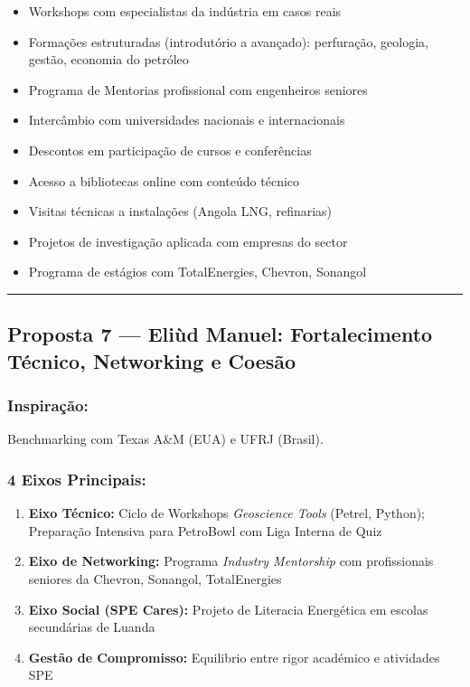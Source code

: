 \documentclass[12pt,a4paper]{article}
\begin{document}
\begin{itemize}[itemsep=0.15cm]
    \item Workshops com especialistas da indústria em casos reais
    \item Formações estruturadas (introdutório a avançado): perfuração, geologia, gestão, economia do petróleo
    \item Programa de Mentorias profissional com engenheiros seniores
    \item Intercâmbio com universidades nacionais e internacionais
    \item Descontos em participação de cursos e conferências
    \item Acesso a bibliotecas online com conteúdo técnico
    \item Visitas técnicas a instalações (Angola LNG, refinarias)
    \item Projetos de investigação aplicada com empresas do sector
    \item Programa de estágios com TotalEnergies, Chevron, Sonangol
\end{itemize}

\textcolor{spe-secondary}{\hspace{0.5cm}\rule{0.4\linewidth}{0.8pt}}

\subsection{Proposta 7 — Eliùd Manuel: Fortalecimento Técnico, Networking e Coesão}

\subsubsection*{Inspiração:} Benchmarking com Texas A\&M (EUA) e UFRJ (Brasil).

\subsubsection*{4 Eixos Principais:}

\begin{enumerate}[itemsep=0.2cm]
    \item \textbf{Eixo Técnico:} Ciclo de Workshops \textit{Geoscience Tools} (Petrel, Python); Preparação Intensiva para PetroBowl com Liga Interna de Quiz
    
    \item \textbf{Eixo de Networking:} Programa \textit{Industry Mentorship} com profissionais seniores da Chevron, Sonangol, TotalEnergies
    
    \item \textbf{Eixo Social (SPE Cares):} Projeto de Literacia Energética em escolas secundárias de Luanda
    
    \item \textbf{Gestão de Compromisso:} Equilibrio entre rigor académico e atividades SPE
\end{enumerate}
\end{document}
